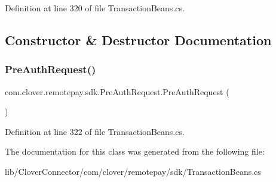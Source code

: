 Definition at line 320 of file Transaction\+Beans.\+cs.



\subsection{Constructor \& Destructor Documentation}
\mbox{\label{classcom_1_1clover_1_1remotepay_1_1sdk_1_1_pre_auth_request_a66a1852aa8059f5ddf1da5a64b2b4067}} 
\subsubsection{\texorpdfstring{Pre\+Auth\+Request()}{PreAuthRequest()}}
{\footnotesize\ttfamily com.\+clover.\+remotepay.\+sdk.\+Pre\+Auth\+Request.\+Pre\+Auth\+Request (\begin{DoxyParamCaption}{ }\end{DoxyParamCaption})}



Definition at line 322 of file Transaction\+Beans.\+cs.



The documentation for this class was generated from the following file\+:\begin{DoxyCompactItemize}
\item 
lib/\+Clover\+Connector/com/clover/remotepay/sdk/Transaction\+Beans.\+cs\end{DoxyCompactItemize}
